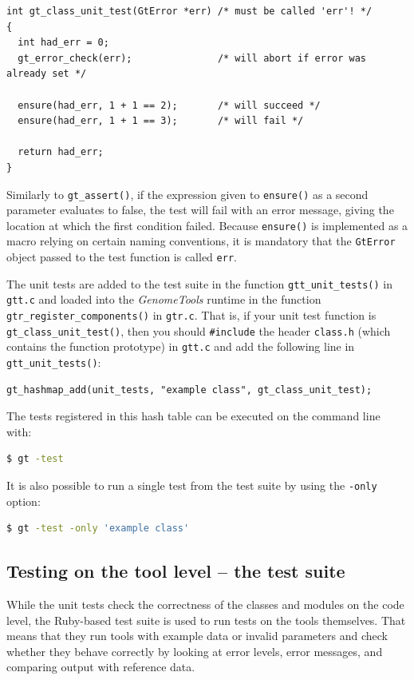 \documentclass[11pt,final]{article}
\newcommand{\keyword}[1]{\lstinline{#1}}
\newcommand{\Gt}[0]{\emph{GenomeTools}\xspace}
\begin{document}
\begin{lstlisting}
int gt_class_unit_test(GtError *err) /* must be called 'err'! */
{
  int had_err = 0;
  gt_error_check(err);               /* will abort if error was already set */           

  ensure(had_err, 1 + 1 == 2);       /* will succeed */
  ensure(had_err, 1 + 1 == 3);       /* will fail */

  return had_err;
}
\end{lstlisting}

Similarly to \keyword{gt_assert()}, if the expression given to
\keyword{ensure()} as a second parameter evaluates to false, the test will fail
with an error message, giving the location at which the first condition failed.
Because \keyword{ensure()} is implemented as a macro relying on certain naming
conventions, it is mandatory that the \keyword{GtError} object passed to the
test function is called \keyword{err}.

The unit tests are added to the test suite in the function
\keyword{gtt_unit_tests()} in \keyword{gtt.c} and loaded into the \Gt runtime
in the function \keyword{gtr_register_components()} in \keyword{gtr.c}.
That is, if your unit test function is \keyword{gt_class_unit_test()}, then you
should \keyword{#include} the header \keyword{class.h} (which contains the
function prototype) in \keyword{gtt.c} and add the following line in
\keyword{gtt_unit_tests()}:
\begin{lstlisting}
gt_hashmap_add(unit_tests, "example class", gt_class_unit_test);
\end{lstlisting}

The tests registered in this hash table can be executed on the command line with:

\begin{lstlisting}[language=sh]
$ gt -test
\end{lstlisting}%

It is also possible to run a single test from the test suite by using the
\keyword{-only} option:

\begin{lstlisting}[language=sh]
$ gt -test -only 'example class'
\end{lstlisting}%

\subsection{Testing on the tool level -- the test suite}
While the unit tests check the correctness of the classes and modules on the
code level, the Ruby-based test suite is used to run tests on the tools
themselves. That means that they run tools with example data or invalid
parameters and check whether they behave correctly by looking at error levels,
error messages, and comparing output with reference data.
\end{document}
